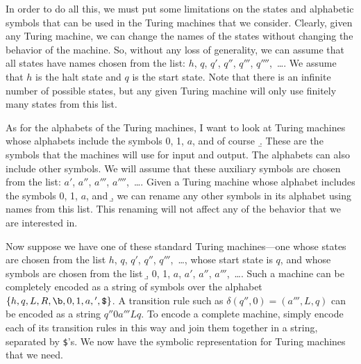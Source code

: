 In order to do all this, we must put some limitations on
the states and alphabetic symbols that can be used in the Turing machines
that we consider.
Clearly, given any Turing machine, we can change the names of the
states without changing the behavior of the machine.  So, without any
loss of generality, we can assume that all states have names chosen
from the list: $h$, $q$, $q'$, $q''$, $q'''$, $q''''$,~\dots.
We assume that $h$ is the halt state and $q$ is the start state.
Note that there is an infinite number of possible states, but any
given Turing machine will only use finitely many states from this
list.  

As for the alphabets of the Turing machines, I want to look at
Turing machines whose alphabets include the symbols 0, 1, $a$, and of
course~\b.
These are the symbols that the machines will use for input and output.
The alphabets can also include other symbols.  We will assume that
these auxiliary symbols are chosen from the list: $a'$, $a''$, $a'''$,
$a''''$,~\dots.  Given a Turing machine whose alphabet includes
the symbols 0, 1, $a$, and \b, we can rename any other symbols in its
alphabet using names from this list.  This renaming will not
affect any of the behavior that we are interested in.

Now suppose we have one of these standard Turing machines---one
whose states are chosen from the list $h$, $q$, $q'$, $q''$, $q'''$,~\dots,
whose start state is $q$, and whose symbols are chosen from the list
\b, 0, 1, $a$, $a'$, $a''$, $a'''$,~\dots.  Such a machine can be
completely encoded as a string of symbols over the alphabet
$\{h,q,L,R,\b,0,1,a,{}',\text{\tt\$}\}$.  A transition rule
such as $\delta(q'',0)=(a''',L,q)$ can be encoded as a
string $q''0a'''Lq$.  To encode a complete machine, simply encode
each of its transition rules in this way and join them together in a string,
separated by {\tt\$}'s.  We now have the symbolic representation for
Turing machines that we need.

